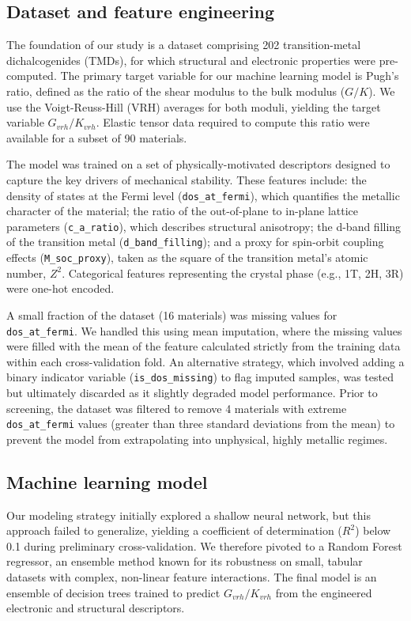 \documentclass[]{article}
\begin{document}
\subsection{Dataset and feature engineering}

The foundation of our study is a dataset comprising 202 transition-metal dichalcogenides (TMDs), for which structural and electronic properties were pre-computed. The primary target variable for our machine learning model is Pugh's ratio, defined as the ratio of the shear modulus to the bulk modulus ($G/K$). We use the Voigt-Reuss-Hill (VRH) averages for both moduli, yielding the target variable $G_{vrh}/K_{vrh}$. Elastic tensor data required to compute this ratio were available for a subset of 90 materials.

The model was trained on a set of physically-motivated descriptors designed to capture the key drivers of mechanical stability. These features include: the density of states at the Fermi level (\texttt{dos\_at\_fermi}), which quantifies the metallic character of the material; the ratio of the out-of-plane to in-plane lattice parameters (\texttt{c\_a\_ratio}), which describes structural anisotropy; the d-band filling of the transition metal (\texttt{d\_band\_filling}); and a proxy for spin-orbit coupling effects (\texttt{M\_soc\_proxy}), taken as the square of the transition metal's atomic number, $Z^2$. Categorical features representing the crystal phase (e.g., 1T, 2H, 3R) were one-hot encoded.

A small fraction of the dataset (16 materials) was missing values for \texttt{dos\_at\_fermi}. We handled this using mean imputation, where the missing values were filled with the mean of the feature calculated strictly from the training data within each cross-validation fold. An alternative strategy, which involved adding a binary indicator variable (\texttt{is\_dos\_missing}) to flag imputed samples, was tested but ultimately discarded as it slightly degraded model performance. Prior to screening, the dataset was filtered to remove 4 materials with extreme \texttt{dos\_at\_fermi} values (greater than three standard deviations from the mean) to prevent the model from extrapolating into unphysical, highly metallic regimes.

\subsection{Machine learning model}

Our modeling strategy initially explored a shallow neural network, but this approach failed to generalize, yielding a coefficient of determination ($R^2$) below 0.1 during preliminary cross-validation. We therefore pivoted to a Random Forest regressor, an ensemble method known for its robustness on small, tabular datasets with complex, non-linear feature interactions. The final model is an ensemble of decision trees trained to predict $G_{vrh}/K_{vrh}$ from the engineered electronic and structural descriptors.
\end{document}
